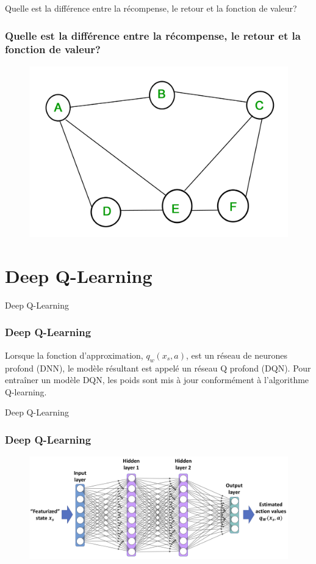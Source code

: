 \documentclass[serif, aspectratio=169]{beamer}
\begin{document}
\begin{frame}{Quelle est la différence entre la récompense, le retour et la fonction de valeur?}
	\frametitle{Quelle est la différence entre la récompense, le retour et la fonction de valeur?}
	
	\begin{figure}[htpb]
		\centering
		\includegraphics[keepaspectratio, scale=0.2]{images/graph.jpg}
	\end{figure}
	
\end{frame}


\section{Deep Q-Learning}

\begin{frame}{Deep Q-Learning}
	\frametitle{Deep Q-Learning}
	
	Lorsque la fonction d'approximation, \( q_w(x_s, a) \), est un réseau de neurones profond (DNN), le modèle résultant est appelé un réseau Q profond (DQN). Pour entraîner un modèle DQN, les poids sont mis à jour conformément à l'algorithme Q-learning.
	
\end{frame}

\begin{frame}{Deep Q-Learning}
	\frametitle{Deep Q-Learning}
	
	\begin{figure}[htpb]
		\centering
		\includegraphics[keepaspectratio, scale=0.6]{images/dqn.png}
	\end{figure}
	
\end{frame}
\end{document}
